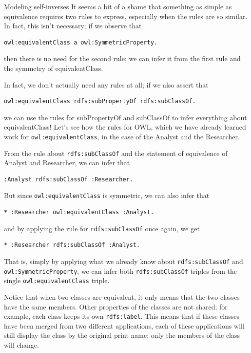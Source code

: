 \begin{challenge}{Modeling self-inverses}
It seems a bit of a shame that something as simple as equivalence
requires two rules to express, especially when the rules are so similar.
In fact, this isn't necessary; if we observe that

\begin{lstlisting}
owl:equivalentClass a owl:SymmetricProperty.
\end{lstlisting}

then there is no need for the second rule; we can infer it from the
first rule and the symmetry of
equivalentClass.

In fact, we don't actually need any rules at all; if we also assert that

\begin{lstlisting}
owl:equivalentClass rdfs:subPropertyOf rdfs:subClassOf.
\end{lstlisting}

we can use the rules for subPropertyOf and subClassOf to infer
everything about equivalentClass! Let's see how the rules for OWL, which
we have already learned work for \texttt{owl:equivalentClass}, in the case of the
Analyst and the Researcher.

From the rule about \texttt{rdfs:subClassOf} and the statement of equivalence of
Analyst and
Researcher, we can infer that

\begin{lstlisting}
:Analyst rdfs:subClassOf :Researcher.
\end{lstlisting}

But since \texttt{owl:equivalentClass} is symmetric, we can also infer that

\begin{lstlisting}
* :Researcher owl:equivalentClass :Analyst.
\end{lstlisting}

and by applying the rule for \texttt{rdfs:subClassOf} once again, we get

\begin{lstlisting}
* :Researcher rdfs:subClassOf :Analyst.
\end{lstlisting}

That is, simply by applying what we already know about \texttt{rdfs:subClassOf}
and \texttt{owl:SymmetricProperty}, we can infer both \texttt{rdfs:subClassOf} triples
from the single \texttt{owl:equivalentClass} triple.

Notice that when two classes are equivalent, it only means that the two
classes have the same members. Other properties of the classes are not
shared; for example, each class keeps its own
\texttt{rdfs:label}. This means that if these classes have been merged from two
different applications, each of these applications will still display
the class by the original print name; only the members of the class will
change.


\end{challenge}
